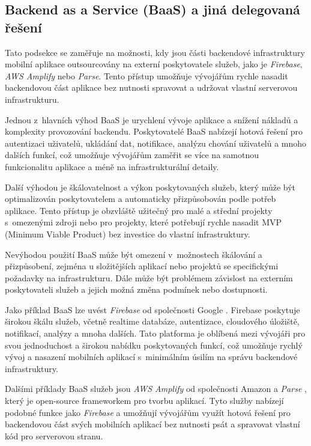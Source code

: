 \subsection{Backend as a Service (BaaS) a jiná delegovaná řešení}\label{baas}

Tato podsekce se zaměřuje na možnosti, kdy jsou části backendové infrastruktury mobilní aplikace outsourcovány na externí poskytovatele služeb, jako je \emph{Firebase}, \emph{AWS Amplify} nebo \emph{Parse}. Tento přístup umožňuje vývojářům rychle nasadit backendovou část aplikace bez nutnosti spravovat a udržovat vlastní serverovou infrastrukturu.

Jednou z~hlavních výhod BaaS je urychlení vývoje aplikace a snížení nákladů a komplexity provozování backendu. Poskytovatelé BaaS nabízejí hotová řešení pro autentizaci uživatelů, ukládání dat, notifikace, analýzu chování uživatelů a mnoho dalších funkcí, což umožňuje vývojářům zaměřit se více na samotnou funkcionalitu aplikace a méně na infrastrukturální detaily.

Další výhodou je škálovatelnost a výkon poskytovaných služeb, který může být optimalizován poskytovatelem a automaticky přizpůsobován podle potřeb aplikace. Tento přístup je obzvláště užitečný pro malé a střední projekty s~omezenými zdroji nebo pro projekty, které potřebují rychle nasadit MVP (Minimum Viable Product) bez investice do vlastní infrastruktury.

Nevýhodou použití BaaS může být omezení v~možnostech škálování a přizpůsobení, zejména u složitějších aplikací nebo projektů se specifickými požadavky na infrastrukturu. Dále může být problémem závislost na externím poskytovateli služeb a jejich možná změna podmínek nebo dostupnosti.

Jako příklad BaaS lze uvést \emph{Firebase} od společnosti Google \cite{firebase}. Firebase poskytuje širokou škálu služeb, včetně realtime databáze, autentizace, cloudového úložiště, notifikací, analýzy a mnoha dalších. Tato platforma je oblíbená mezi vývojáři pro svou jednoduchost a širokou nabídku poskytovaných funkcí, což umožňuje rychlý vývoj a nasazení mobilních aplikací s~minimálním úsilím na správu backendové infrastruktury.

Dalšími příklady BaaS služeb jsou \emph{AWS Amplify} od společnosti Amazon \cite{aws-amplify} a \emph{Parse} \cite{parse}, který je open-source frameworkem pro tvorbu aplikací. Tyto služby nabízejí podobné funkce jako \emph{Firebase} a umožňují vývojářům využít hotová řešení pro backendovou část svých mobilních aplikací bez nutnosti psát a spravovat vlastní kód pro serverovou stranu.

